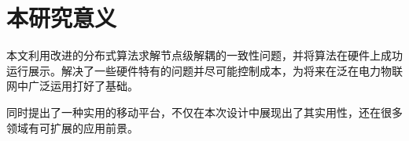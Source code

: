 

\section{本研究意义}

本文利用改进的分布式算法求解节点级解耦的一致性问题，并将算法在硬件上成功运行展示。解决了一些硬件特有的问题并尽可能控制成本，为将来在泛在电力物联网中广泛运用打好了基础。

同时提出了一种实用的移动平台，不仅在本次设计中展现出了其实用性，还在很多领域有可扩展的应用前景。